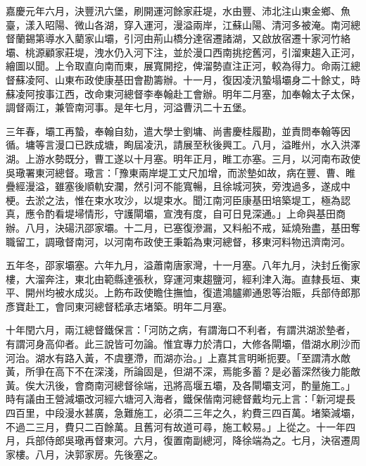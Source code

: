 \begin{pinyinscope}
嘉慶元年六月，決豐汛六堡，刷開運河餘家莊堤，水由豐、沛北注山東金鄉、魚臺，漾入昭陽、微山各湖，穿入運河，漫溢兩岸，江蘇山陽、清河多被淹。南河總督蘭錫第導水入藺家山壩，引河由荊山橋分達宿遷諸湖，又啟放宿遷十家河竹絡壩、桃源顧家莊堤，洩水仍入河下注，並於漫口西南挑挖舊河，引溜東趨入正河，繪圖以聞。上令取直向南而東，展寬開挖，俾溜勢直注正河，較為得力。命兩江總督蘇凌阿、山東布政使康基田會勘籌辦。十一月，復因凌汛蟄塌壩身二十餘丈，時蘇凌阿按事江西，改命東河總督李奉翰赴工會辦。明年二月塞，加奉翰太子太保，調督兩江，兼管南河事。是年七月，河溢曹汛二十五堡。

三年春，壩工再蟄，奉翰自劾，遣大學士劉墉、尚書慶桂履勘，並責問奉翰等因循。墉等言漫口已跌成塘，眴屆凌汛，請展至秋後興工。八月，溢睢州，水入洪澤湖。上游水勢既分，曹工遂以十月塞。明年正月，睢工亦塞。三月，以河南布政使吳璥署東河總督。璥言：「豫東兩岸堤工丈尺加增，而淤墊如故，病在豐、曹、睢疊經漫溢，雖塞後順軌安瀾，然引河不能寬暢，且徐城河狹，旁洩過多，遂成中梗。去淤之法，惟在束水攻沙，以堤束水。聞江南河臣康基田培築堤工，極為認真，應令酌看堤埽情形，守護閘壩，宣洩有度，自可日見深通。」上命與基田商辦。八月，決碭汛邵家壩。十二月，已塞復滲漏，又料船不戒，延燒殆盡，基田奪職留工，調璥督南河，以河南布政使王秉韜為東河總督，移東河料物迅濟南河。

五年冬，邵家壩塞。六年九月，溢蕭南唐家灣，十一月塞。八年九月，決封丘衡家樓，大溜奔注，東北由範縣達張秋，穿運河東趨鹽河，經利津入海。直隸長垣、東平、開州均被水成災。上飭布政使瞻住撫恤，復遣鴻臚卿通恩等治賑，兵部侍郎那彥寶赴工，會同東河總督嵇承志堵築。明年二月塞。

十年閏六月，兩江總督鐵保言：「河防之病，有謂海口不利者，有謂洪湖淤墊者，有謂河身高仰者。此三說皆可勿論。惟宜專力於清口，大修各閘壩，借湖水刷沙而河治。湖水有路入黃，不虞壅滯，而湖亦治。」上嘉其言明晰扼要。「至謂清水敵黃，所爭在高下不在深淺，所論固是，但湖不深，焉能多蓄？是必蓄深然後力能敵黃。俟大汛後，會商南河總督徐端，迅將高堰五壩，及各閘壩支河，酌量施工。」時有議由王營減壩改河經六塘河入海者，鐵保偕南河總督戴均元上言：「新河堤長四百里，中段漫水甚廣，急難施工，必須二三年之久，約費三四百萬。堵築減壩，不過二三月，費只二百餘萬。且舊河有故道可尋，施工較易。」上從之。十一年四月，兵部侍郎吳璥再督東河。六月，復置南副總河，降徐端為之。七月，決宿遷周家樓。八月，決郭家房。先後塞之。


\end{pinyinscope}
